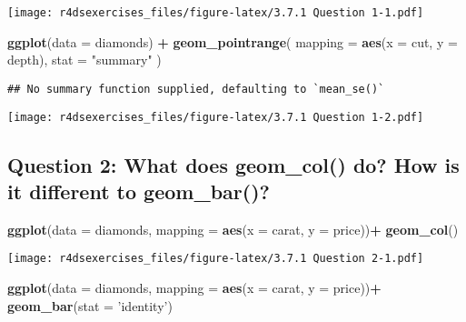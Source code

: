 \documentclass[
]{book}
\newenvironment{Shaded}{\begin{snugshade}}{\end{snugshade}}
\newcommand{\DataTypeTok}[1]{\textcolor[rgb]{0.13,0.29,0.53}{#1}}
\newcommand{\KeywordTok}[1]{\textcolor[rgb]{0.13,0.29,0.53}{\textbf{#1}}}
\newcommand{\NormalTok}[1]{#1}
\newcommand{\OperatorTok}[1]{\textcolor[rgb]{0.81,0.36,0.00}{\textbf{#1}}}
\newcommand{\StringTok}[1]{\textcolor[rgb]{0.31,0.60,0.02}{#1}}
\begin{document}
\texttt{[image: r4dsexercises\_files/figure-latex/3.7.1 Question 1-1.pdf]}

\begin{Shaded}
\begin{Highlighting}[]
\KeywordTok{ggplot}\NormalTok{(}\DataTypeTok{data =}\NormalTok{ diamonds) }\OperatorTok{+}\StringTok{ }
\StringTok{   }\KeywordTok{geom_pointrange}\NormalTok{(}
    \DataTypeTok{mapping =} \KeywordTok{aes}\NormalTok{(}\DataTypeTok{x =}\NormalTok{ cut, }\DataTypeTok{y =}\NormalTok{ depth),}
    \DataTypeTok{stat =} \StringTok{"summary"}
\NormalTok{  )}
\end{Highlighting}
\end{Shaded}

\begin{verbatim}
## No summary function supplied, defaulting to `mean_se()`
\end{verbatim}

\texttt{[image: r4dsexercises\_files/figure-latex/3.7.1 Question 1-2.pdf]}

\hypertarget{question-2-what-does-geom_col-do-how-is-it-different-to-geom_bar}{%
\subsection{Question 2: What does geom\_col() do? How is it different to geom\_bar()?}\label{question-2-what-does-geom_col-do-how-is-it-different-to-geom_bar}}

\begin{Shaded}
\begin{Highlighting}[]
\KeywordTok{ggplot}\NormalTok{(}\DataTypeTok{data =}\NormalTok{ diamonds, }\DataTypeTok{mapping =} \KeywordTok{aes}\NormalTok{(}\DataTypeTok{x =}\NormalTok{ carat, }\DataTypeTok{y =}\NormalTok{ price))}\OperatorTok{+}
\StringTok{  }\KeywordTok{geom_col}\NormalTok{()}
\end{Highlighting}
\end{Shaded}

\texttt{[image: r4dsexercises\_files/figure-latex/3.7.1 Question 2-1.pdf]}

\begin{Shaded}
\begin{Highlighting}[]
\KeywordTok{ggplot}\NormalTok{(}\DataTypeTok{data =}\NormalTok{ diamonds, }\DataTypeTok{mapping =} \KeywordTok{aes}\NormalTok{(}\DataTypeTok{x =}\NormalTok{ carat, }\DataTypeTok{y =}\NormalTok{ price))}\OperatorTok{+}
\StringTok{  }\KeywordTok{geom_bar}\NormalTok{(}\DataTypeTok{stat =} \StringTok{'identity'}\NormalTok{)}
\end{Highlighting}
\end{Shaded}
\end{document}
